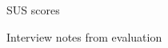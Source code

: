 \documentclass[a4paper]{report}
\begin{document}
\appendix


\begin{figure}[h!]
    \centering
	\hfill
	\caption{SUS scores}\label{sus}
  \small
\end{figure}

\begin{figure}[h!]
    \centering
	\hfill
	\caption{Interview notes from evaluation}
  \small
\end{figure}
\end{document}
